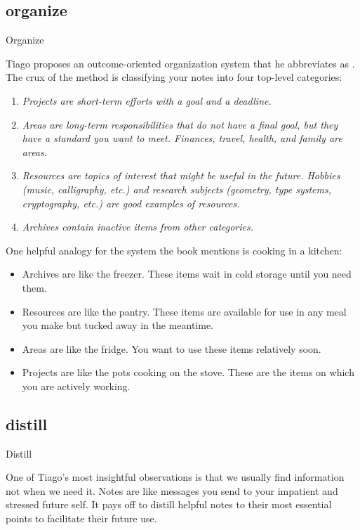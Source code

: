 \documentclass{article}
\begin{document}
\subsection{organize}{Organize}

Tiago proposes an outcome-oriented organization system that he abbreviates as \href{https://fortelabs.com/blog/para/}{}.
The crux of the method is classifying your notes into four top-level categories:
\begin{enumerate}
  \item 
    \em{Projects} are short-term efforts with a goal and a deadline.
  \item 
    \em{Areas} are long-term responsibilities that do not have a final goal, but they have a standard you want to meet.
    Finances, travel, health, and family are areas.
  \item 
    \em{Resources} are topics of interest that might be useful in the future.
    Hobbies (music, calligraphy, etc.) and research subjects (geometry, type systems, cryptography, etc.) are good examples of resources.
  \item 
    \em{Archives} contain inactive items from other categories.
\end{enumerate}

One helpful analogy for the  system the book mentions is cooking in a kitchen:
\begin{itemize}
  \item Archives are like the freezer. These items wait in cold storage until you need them.
  \item Resources are like the pantry. These items are available for use in any meal you make but tucked away in the meantime.
  \item Areas are like the fridge. You want to use these items relatively soon.
  \item Projects are like the pots cooking on the stove. These are the items on which you are actively working.
\end{itemize}

\subsection{distill}{Distill}

One of Tiago's most insightful observations is that we usually find information not when we need it.
Notes are like messages you send to your impatient and stressed future self.
It pays off to distill helpful notes to their most essential points to facilitate their future use.
\end{document}
